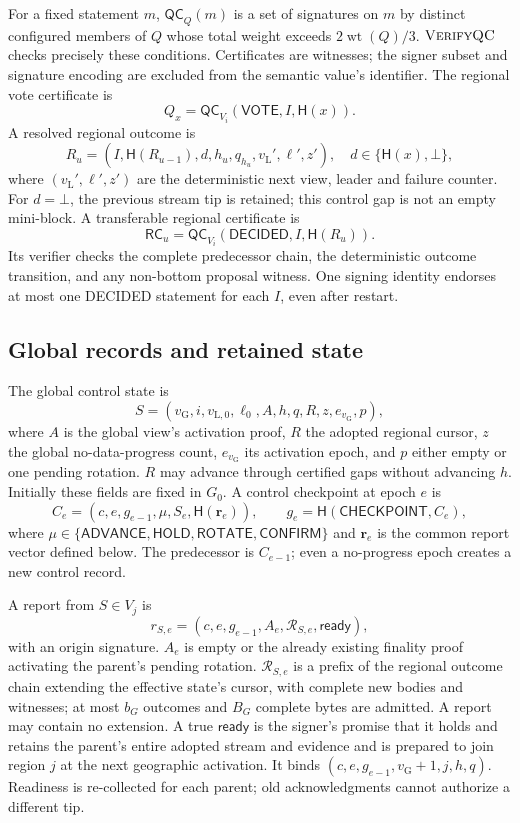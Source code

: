 \documentclass[11pt,a4paper,onecolumn]{article}
\newcommand{\Hash}{\mathsf H}
\newcommand{\QC}{\mathsf{QC}}
\newcommand{\RC}{\mathsf{RC}}
\newcommand{\gv}{v_{\mathrm G}}
\newcommand{\lv}{v_{\mathrm L}}
\newcommand{\botv}{\bot}
\newcommand{\wt}{\operatorname{wt}}
\newcommand{\Tag}[1]{\mathsf{#1}}
\newcommand{\Proc}[1]{\textnormal{\textsc{#1}}}
\theoremstyle{remark}\newtheorem{example}[definition]{Example}
\begin{document}
For a fixed statement $m$, $\QC_Q(m)$ is a set of signatures on $m$ by distinct
configured members of $Q$ whose total weight exceeds $2\wt(Q)/3$.
$\Proc{VerifyQC}$ checks precisely these conditions. Certificates are witnesses;
the signer subset and signature encoding are excluded from the semantic value's
identifier. The regional vote certificate is
\[
 Q_x=\QC_{V_i}(\Tag{VOTE},I,\Hash(x)).
\]
A resolved regional outcome is
\[
 R_u=(I,\Hash(R_{u-1}),d,h_u,q_{h_u},\lv',\ell',z'),
 \quad d\in\{\Hash(x),\botv\},
\]
where $(\lv',\ell',z')$ are the deterministic next view, leader and failure counter.
For $d=\botv$, the previous stream tip is retained; this control gap is not an
empty mini-block. A transferable regional certificate is
\begin{equation}\label{eq:rc}
 \RC_u=\QC_{V_i}(\Tag{DECIDED},I,\Hash(R_u)).
\end{equation}
Its verifier checks the complete predecessor chain, the deterministic outcome
transition, and any non-bottom proposal witness. One signing identity endorses
at most one DECIDED statement for each $I$, even after restart.

\subsection{Global records and retained state}\label{sec:gobjects}
The global control state is
\[
 S=(\gv,i,v_{\mathrm L,0},\ell_0,A,h,q,R,z,e_{\gv},p),
\]
where $A$ is the global view's activation proof, $R$ the adopted regional cursor,
$z$ the global no-data-progress count, $e_{\gv}$ its activation epoch, and $p$ either
empty or one pending rotation. $R$ may advance through certified gaps without
advancing $h$. Initially these fields are fixed in $G_0$.
A control checkpoint at epoch $e$ is
\begin{equation}\label{eq:global}
 C_e=(c,e,g_{e-1},\mu,S_e,\Hash(\mathbf r_e)),\qquad
 g_e=\Hash(\Tag{CHECKPOINT},C_e),
\end{equation}
where $\mu\in\{\Tag{ADVANCE},\Tag{HOLD},\Tag{ROTATE},\Tag{CONFIRM}\}$ and
$\mathbf r_e$ is the common report vector defined below. The predecessor is
$C_{e-1}$; even a no-progress epoch creates a new control record.

A report from $S\in V_j$ is
\[
 r_{S,e}=(c,e,g_{e-1},A_e,\mathcal R_{S,e},\mathsf{ready}),
\]
with an origin signature. $A_e$ is empty or the already existing finality proof
activating the parent's pending rotation. $\mathcal R_{S,e}$ is a prefix of the
regional outcome chain extending the effective state's cursor, with complete
new bodies and witnesses; at most $b_G$ outcomes and $B_G$ complete bytes are
admitted. A report may contain no extension. A true $\mathsf{ready}$ is the
signer's promise that it holds and retains the parent's entire adopted stream
and evidence and is prepared to join region $j$ at the next geographic
activation. It binds $(c,e,g_{e-1},\gv+1,j,h,q)$. Readiness is re-collected for each
parent; old acknowledgments cannot authorize a different tip.
\end{document}
